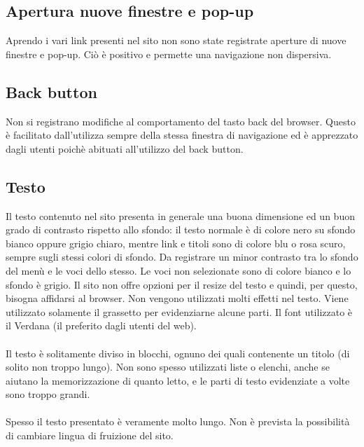 \documentclass[../ProgettoTecWeb2.tex]{subfiles}
\begin{document}
	\subsection{Apertura nuove finestre e pop-up}
	Aprendo i vari link presenti nel sito non sono state registrate aperture di nuove finestre e pop-up. Ciò è positivo e permette una navigazione non dispersiva.

	\subsection{Back button}
	Non si registrano modifiche al comportamento del tasto back del browser. Questo è facilitato dall'utilizza sempre della stessa finestra di navigazione ed è apprezzato dagli utenti poichè abituati all'utilizzo del back button.

	\subsection{Testo}
	Il testo contenuto nel sito presenta in generale una buona dimensione ed un buon grado di contrasto rispetto allo sfondo: il testo normale è di colore nero su sfondo bianco oppure grigio chiaro, mentre link e titoli sono di colore blu o rosa scuro, sempre sugli stessi colori di sfondo. Da registrare un minor contrasto tra lo sfondo del menù e le voci dello stesso. Le voci non selezionate sono di colore bianco e lo sfondo è grigio. Il sito non offre opzioni per il resize del testo e quindi, per questo, bisogna affidarsi al browser. Non vengono utilizzati molti effetti nel testo. Viene utilizzato solamente il grassetto per evidenziarne alcune parti. Il font utilizzato è il Verdana (il preferito dagli utenti del web). 
	
	\paragraph{}
	Il testo è solitamente diviso in blocchi, ognuno dei quali contenente un titolo (di solito non troppo lungo). Non sono spesso utilizzati liste o elenchi, anche se aiutano la memorizzazione di quanto letto, e le parti di testo evidenziate a volte sono troppo grandi. 
	
	\paragraph{}
	Spesso il testo presentato è veramente molto lungo. Non è prevista la possibilità di cambiare lingua di fruizione del sito.
\end{document}
